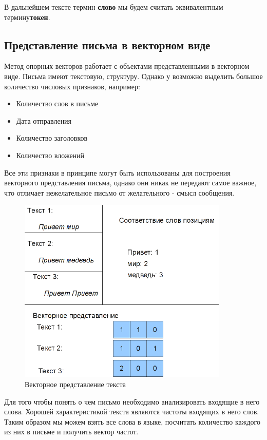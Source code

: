 В дальнейшем тексте термин \textbf{слово} мы будем считать эквивалентным термину\textbf{токен}.

\subsection{Представление письма в векторном виде}
\label{MESSAGEVECTOR}
Метод опорных векторов работает с объектами представленными в векторном виде.
Письма имеют текстовую, структуру. Однако у возможно выделить большое количество
числовых признаков, например:
\begin{itemize}
    \item Количество слов в письме
    \item Дата отправления
    \item Количество заголовков
    \item Количество вложений
\end{itemize}
Все эти признаки в принципе могут быть использованы для построения векторного
представления письма, однако они никак не передают самое важное, что отличает
нежелательное письмо от желательного - смысл сообщения.

\begin{figure}[h]
\begin{center}
\includegraphics[width=10cm]{img/vectorize}
\end{center}
\caption{Векторное представление текста}
\label{svm-kernel}
\end{figure}

Для того чтобы понять о чем письмо необходимо анализировать входящие в него слова.
Хорошей характеристикой текста являются частоты входящих в него слов.
Таким образом мы можем взять все слова в языке, посчитать количество каждого из них в письме
и получить вектор частот.

